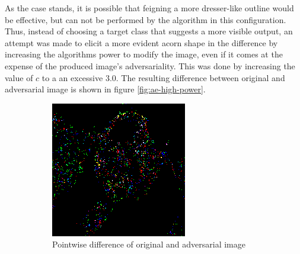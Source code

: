 \documentclass[11pt, a4paper]{article}
\begin{document}
As the case stands, it is possible that feigning a more dresser-like outline would be effective, but can not be performed by the algorithm in this configuration. Thus, instead of choosing a target class that suggests a more visible output, an attempt was made to elicit a more evident acorn shape in the difference by increasing the algorithms power to modify the image, even if it comes at the expense of the produced image's adversariality. This was done by increasing the value of $c$ to a an excessive $3.0$. The resulting difference between original and adversarial image is shown in figure \ref{fig:ae-high-power}.

\begin{figure}[htb]
    \centering
    \begin{subfigure}[b]{0.45\textwidth}
        \includegraphics[width=\textwidth]{aes_new/panda_acorn_10_3dot0_posdiff.png}
        \caption{Pointwise difference of original and adversarial image}
        \label{fig:ae-high-power-img}
    \end{subfigure}
    ~ %
    \begin{subfigure}[b]{0.45\textwidth}

\end{subfigure}
\end{figure}
\end{document}
